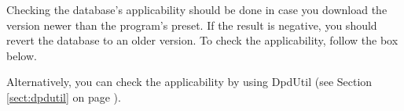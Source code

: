Checking the database's applicability should be done in case you download the version newer than the program's preset. If the result is negative, you should revert the database to an older version. To check the applicability, follow the box below.

\newpage
{}

Alternatively, you can check the applicability by using \mbox{DpdUtil} (see Section \ref{sect:dpdutil} on page \pageref{sect:dpdutil}).
